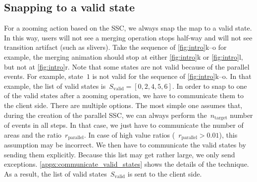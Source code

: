 \documentclass[]{interact}
\begin{document}
\subsection{Snapping to a valid state}
\label{sec:snap}

For a zooming action based on the SSC, 
we always snap the map to a valid state.
In this way, users will not see a merging operation stops half-way
and will not see transition artifact (such as slivers).
Take the sequence of \fig\ref{fig:intro}k--o for example, 
the merging animation should stop at 
either \ref{fig:intro}k or \ref{fig:intro}l,
but not at \ref{fig:intro}r.
Note that some states are not valid because of the parallel events.
For example, state~$1$ is not valid 
for the sequence of \fig\ref{fig:intro}k--o.
In that example, the list of valid states 
is~$S_\mathrm{valid} = [0, 2, 4, 5, 6]$.
In order to snap to one of the valid states after a zooming operation,
we have to communicate them to the client side. 
There are multiple options. 
The most simple one assumes that, 
during the creation of the parallel SSC, 
we can always perform the~$n_\mathrm{target}$ number of events in all steps. 
In that case, we just have to communicate 
the number of areas and the ratio~$r_\mathrm{parallel}$. 
In case of high value ratios (\eg~$r_\mathrm{parallel} > 0.01$), 
this assumption may be incorrect. 
We then have to communicate the valid states by sending them explicitly. 
Because this list may get rather large,
we only send exceptions.
\appx\ref{appx:communicate_valid_states} shows the details of the technique.
As a result, the list of valid states~$S_\mathrm{valid}$ is sent to the client side.
\end{document}
